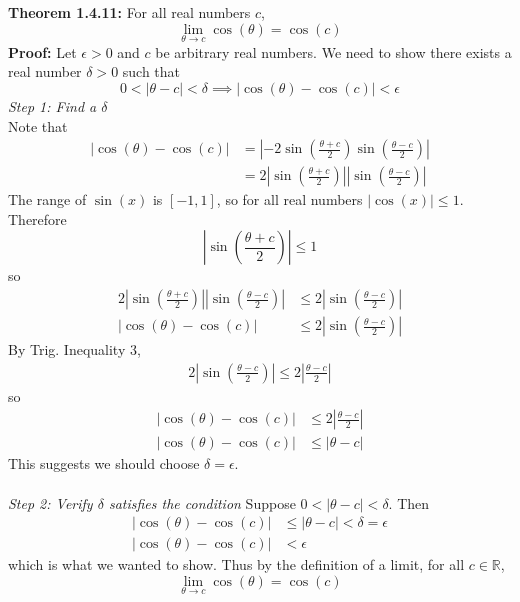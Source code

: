 \documentclass{article}
\begin{document}
	\textbf{Theorem 1.4.11:} For all real numbers $c$,
	$$\lim_{\theta \to c}{\cos{(\theta)}} = \cos{(c)}$$
	\textbf{Proof:}
	Let $\epsilon > 0$ and $c$ be arbitrary real numbers. We need to show there exists a real number $\delta > 0$ such that
	$$0 < |\theta - c| < \delta \implies |\cos{(\theta)} - \cos{(c)}| < \epsilon$$
	\textit{Step 1: Find a $\delta$} \\
	Note that
	\begin{align*}
		|\cos{(\theta)} - \cos{(c)}| &= \left|-2\sin{\left(\frac{\theta + c}{2}\right)}\sin{\left(\frac{\theta - c}{2}\right)}\right| \tag{Sum to Product Formula} \\
		&= 2\left|\sin{\left(\frac{\theta + c}{2}\right)}\right|\left|\sin{\left(\frac{\theta - c}{2}\right)} \right|
	\end{align*}
	The range of $\sin{(x)}$ is $[-1, 1]$, so for all real numbers $|\cos{(x)}| \leq 1$. Therefore
	$$\left|\sin{\left(\frac{\theta + c}{2}\right)} \right| \leq 1$$
	so
	\begin{align*}
		2\left|\sin{\left(\frac{\theta + c}{2}\right)}\right|\left|\sin{\left(\frac{\theta - c}{2}\right)} \right| &\leq 2\left|\sin{\left(\frac{\theta - c}{2}\right)}\right| \\
		|\cos{(\theta)} - \cos{(c)}| &\leq 2\left|\sin{\left(\frac{\theta - c}{2}\right)}\right|
	\end{align*}
	By Trig. Inequality 3,
	\begin{align*}
		2\left|\sin{\left(\frac{\theta - c}{2}\right)}\right| \leq 2\left|\frac{\theta - c}{2}\right|
	\end{align*}
	so
	\begin{align*}
		|\cos{(\theta)} - \cos{(c)}| &\leq 2\left|\frac{\theta - c}{2}\right| \\
		|\cos{(\theta)} - \cos{(c)}| &\leq |\theta - c|
	\end{align*}
	This suggests we should choose $\delta = \epsilon$. \\\\
	\textit{Step 2: Verify $\delta$ satisfies the condition}
	Suppose $0 < |\theta - c| < \delta$. Then
	\begin{align*}
		|\cos{(\theta)} - \cos{(c)}| &\leq |\theta - c| < \delta = \epsilon \\
		|\cos{(\theta)} - \cos{(c)}| &< \epsilon
	\end{align*}
	which is what we wanted to show. Thus by the definition of a limit, for all $c \in \mathbb{R}$,
	$$\lim_{\theta \to c}{\cos{(\theta)}} = \cos{(c)}$$
\end{document}

